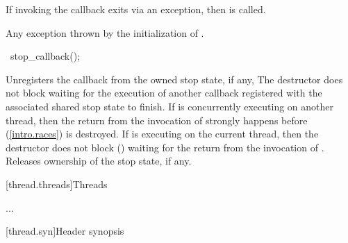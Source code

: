 {\begin{itemdescr}
                If invoking the callback exits via an exception,
                then  is called.

  \pnum\throws Any exception thrown by the initialization of .
\end{itemdescr}

%
\begin{itemdecl}
~stop_callback();
\end{itemdecl}
\begin{itemdescr}
  \pnum\effects Unregisters the callback from the owned stop state, if any, 
                The destructor does not block waiting for the execution of another callback registered
                with the associated shared stop state to finish.
                If  is concurrently executing on another thread, then the return
                from the invocation of  strongly happens before
                (\ref{intro.races})
                 is destroyed.
                If  is executing on the current thread, then
                the destructor does not block () waiting for the return from
                the invocation of .
                Releases ownership of the stop state, if any.

\end{itemdescr}

}%

\clearpage

[thread.threads]{Threads}

...

[thread.syn]{Header  synopsis}
%

\begin{codeblock}
namespace std {
  class thread;

  void swap(thread& x, thread& y) noexcept;
\end{codeblock}

